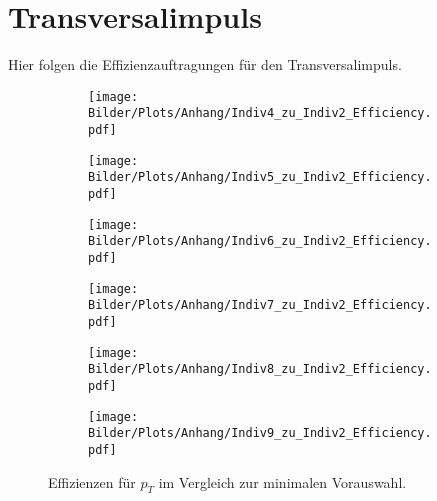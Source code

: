 \section{Transversalimpuls}\label{pt}%
Hier folgen die Effizienzauftragungen für den Transversalimpuls.
\clearpage
\begin{figure}
  \begin{subfigure}[t]{0.5\textwidth}
  \texttt{[image: Bilder/Plots/Anhang/Indiv4\_zu\_Indiv2\_Efficiency.pdf]}
  \end{subfigure}
\begin{subfigure}[t]{0.5\textwidth}
 \texttt{[image: Bilder/Plots/Anhang/Indiv5\_zu\_Indiv2\_Efficiency.pdf]}
\end{subfigure}
\begin{subfigure}[t]{0.5\textwidth}
  \texttt{[image: Bilder/Plots/Anhang/Indiv6\_zu\_Indiv2\_Efficiency.pdf]}
\end{subfigure}
\begin{subfigure}[t]{0.5\textwidth}
  \texttt{[image: Bilder/Plots/Anhang/Indiv7\_zu\_Indiv2\_Efficiency.pdf]}
\end{subfigure}
\begin{subfigure}[t]{0.5\textwidth}
  \texttt{[image: Bilder/Plots/Anhang/Indiv8\_zu\_Indiv2\_Efficiency.pdf]}
\end{subfigure}
\begin{subfigure}[t]{0.5\textwidth}
  \texttt{[image: Bilder/Plots/Anhang/Indiv9\_zu\_Indiv2\_Efficiency.pdf]}
\end{subfigure}
\caption{Effizienzen für $p_T$ im Vergleich zur minimalen Vorauswahl.}
\end{figure}
\clearpage
